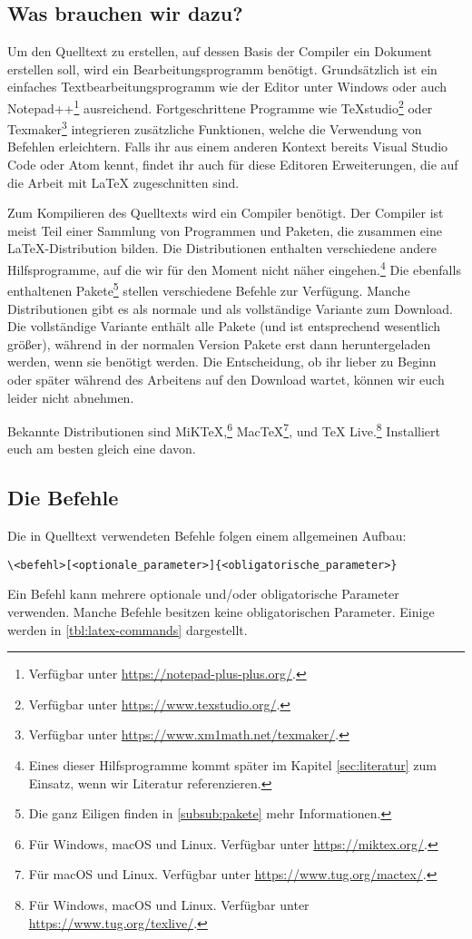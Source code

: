 \subsection{Was brauchen wir dazu?}
\label{sub:was_brauchen_wir_dazu}
Um den Quelltext zu erstellen, auf dessen Basis der Compiler ein Dokument erstellen soll, wird ein Bearbeitungsprogramm benötigt.
Grundsätzlich ist ein einfaches Textbearbeitungsprogramm wie der Editor unter Windows oder auch Notepad++\footnote{Verfügbar unter \url{https://notepad-plus-plus.org/}.} ausreichend.
Fortgeschrittene Programme wie TeXstudio\footnote{Verfügbar unter \url{https://www.texstudio.org/}.} oder Texmaker\footnote{Verfügbar unter \url{https://www.xm1math.net/texmaker/}.} integrieren zusätzliche Funktionen, welche die Verwendung von Befehlen erleichtern.
Falls ihr aus einem anderen Kontext bereits Visual Studio Code oder Atom kennt, findet ihr auch für diese Editoren Erweiterungen, die auf die Arbeit mit \LaTeX{} zugeschnitten sind.

Zum Kompilieren des Quelltexts wird ein Compiler benötigt.
Der Compiler ist meist Teil einer Sammlung von Programmen und Paketen, die zusammen eine \LaTeX-Distribution bilden.
Die Distributionen enthalten verschiedene andere Hilfsprogramme, auf die wir für den Moment nicht näher eingehen.\footnote{Eines dieser Hilfsprogramme kommt später im Kapitel \ref{sec:literatur} zum Einsatz, wenn wir Literatur referenzieren.}
Die ebenfalls enthaltenen Pakete\footnote{Die ganz Eiligen finden in \cref{subsub:pakete} mehr Informationen.} stellen verschiedene Befehle zur Verfügung.
Manche Distributionen gibt es als normale und als vollständige Variante zum Download. 
Die vollständige Variante enthält alle Pakete (und ist entsprechend wesentlich größer), während in der normalen Version Pakete erst dann heruntergeladen werden, wenn sie benötigt werden.
Die Entscheidung, ob ihr lieber zu Beginn oder später während des Arbeitens auf den Download wartet, können wir euch leider nicht abnehmen.

Bekannte Distributionen sind MiK\TeX,\footnote{Für Windows, macOS und Linux. Verfügbar unter \url{https://miktex.org/}.} Mac\TeX\footnote{Für macOS und Linux. Verfügbar unter \url{https://www.tug.org/mactex/}.}, und \TeX{} Live.\footnote{Für Windows, macOS und Linux. Verfügbar unter \url{https://www.tug.org/texlive/}.}
Installiert euch am besten gleich eine davon.

\subsection{Die Befehle}
\label{sub:die_befehle}
Die in Quelltext verwendeten Befehle folgen einem allgemeinen Aufbau:
\begin{verbatim}
\<befehl>[<optionale_parameter>]{<obligatorische_parameter>}
\end{verbatim}
Ein Befehl kann mehrere optionale und/oder obligatorische Parameter verwenden. Manche Befehle besitzen keine obligatorischen Parameter. Einige werden in \cref{tbl:latex-commands} dargestellt.

